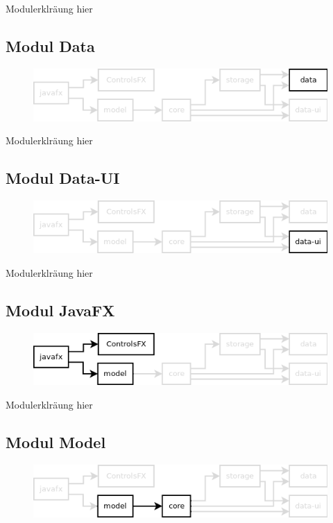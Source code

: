 Modulerklräung hier




\subsection{Modul Data}
\label{mod_data}
\begin{figure}[hb!]
	\centering
	\includegraphics[width=.8\textwidth]{module_dependencies_data.png}
\end{figure}

Modulerklräung hier




\subsection{Modul Data-UI}
\label{mod_data-ui}
\begin{figure}[hb!]
	\centering
	\includegraphics[width=.8\textwidth]{module_dependencies_data-ui.png}
\end{figure}

Modulerklräung hier




\subsection{Modul JavaFX}
\label{mod_javafx}
\begin{figure}[hb!]
	\centering
	\includegraphics[width=.8\textwidth]{module_dependencies_javafx.png}
\end{figure}

Modulerklräung hier




\subsection{Modul Model}
\label{mod_model}
\begin{figure}[hb!]
	\centering
	\includegraphics[width=.8\textwidth]{module_dependencies_model.png}
\end{figure}

